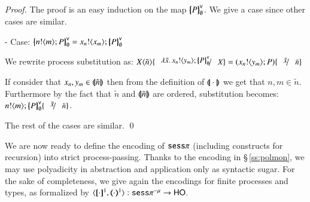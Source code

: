 \begin{proof}
	The proof is an easy induction on the map $\big\{\!\!\big\{P\big\}\!\!\big\}^\mathsf{v}_\emptyset$.
	We give a case since other cases are similar.

	\noi - Case: $\auxmapp{\bout{n}{m} P}{\mathsf{v}}{\es} = \bout{x_n}{x_m} \auxmapp{P}{\mathsf{v}}{\es}$

	\noi We rewrite process substitution as:
	$\appl{X}{\tilde{n}} \subst{\abs{\tilde{x}}{\bout{x_n}{y_m} \auxmapp{P}{\mathsf{v}}{\es}}}{X} = (\bout{x_n}{y_m} P) \subst{\tilde{x}}{\tilde{n}}$

	\noi If consider that $x_n, y_m \in (\!|\!|\tilde{n}|\!|\!)$ then from the definition of $(\!|\!|\cdot|\!|\!)$ we
	get that $n, m \in \tilde{n}$. Furthermore by the fact that $\tilde{n}$ and $(\!|\!|\tilde{n}|\!|\!)$ are
	ordered, substitution becomes:
	$\bout{n}{m} \auxmapp{P}{\mathsf{v}}{\es} \subst{\tilde{x}}{\tilde{n}}$.

	\noi The rest of the cases are similar.
	\qed
\end{proof}

We are now ready to define the encoding of $\mathtt{sess}\pi$
(including constructs for recursion) into strict process-passing.
Thanks to the encoding in \S\,\ref{ss:polmon}, we may use polyadicity in abstraction and application only
as syntactic sugar.
For the sake of completeness, we give again the encodings for 
finite processes and types, as
formalized by $\encod{\cdot}{\cdot}{1}: \sessp^{-\mu} \to \HO$.

